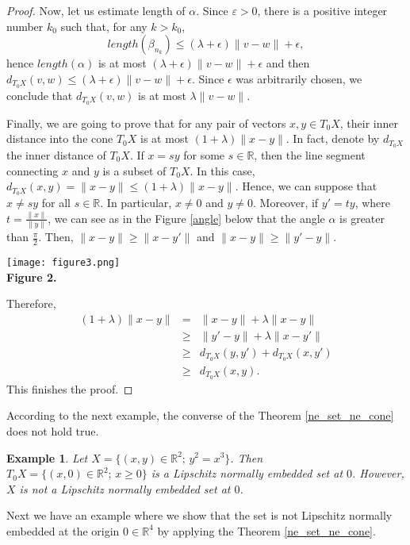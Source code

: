 \documentclass{amsart}
\makeatletter
\newtheorem{example}[theorem]{Example}
\newcommand{\R}{\mathbb{R}}
\newcommand{\mlabel}[2]{\def\@currentlabel{#2}\label{#1}} %
\makeatother
\begin{document}
\begin{proof}
Now, let us estimate length of $\alpha$. Since $\varepsilon >0$, there is a positive integer number $k_0$ such that, for any $k>k_0$, $$ length(\beta_{n_k})\leq (\lambda+\epsilon)\|v-w\|+\epsilon, $$ hence $length(\alpha)$ is at most $(\lambda+\epsilon)\| v-w\|+\epsilon$ and then $d_{T_0X}(v,w)\leq (\lambda+\epsilon)\|v-w\|+\epsilon.$ Since $\epsilon$ was arbitrarily chosen, we conclude that $d_{T_0X}(v,w)$ is at most $\lambda \| v-w\|$.

Finally, we are going to prove that for any pair of vectors $x,y\in T_0X$, their inner distance into the cone $T_0X$ is at most $(1+\lambda)\| x- y\|$. In fact, denote by $d_{T_0X}$ the inner distance of $T_0X$. If $x=sy$ for some $s\in \R$, then the line segment connecting $x$ and $y$ is a subset of ${T_0X}$. In this case, $d_{T_0X}(x,y)=\|x-y\| \leq (1+\lambda)\| x- y\|$. Hence, we can suppose that $x\not=sy$ for all $s\in \R$. In particular, $x\not =0$ and $y\not =0$. Moreover, if $y'=ty$, where $t=\frac{\|x\|}{\|y\|}$, we can see as in the Figure \ref{angle} below that the angle $\alpha$ is greater than $\frac{\pi}{2}$. Then, $\|x-y\|\geq \|x-y'\|$ and $\|x-y\|\geq \|y'-y\|$.
\begin{center}\mlabel{angle}{2}
\texttt{[image: figure3.png]}\\
{\bf Figure 2.}
\end{center}
Therefore,
\begin{eqnarray*}
(1+\lambda)\| x - y\|& = & \| x - y\| +\lambda \| x - y\| \\
&\geq& \| y'- y \| + \lambda \| x - y'\| \\
&\geq& d_{T_0X}(y,y') + d_{T_0X}(x,y') \\
&\geq& d_{T_0X}(x,y).
\end{eqnarray*}
This finishes the proof.
\end{proof}
According to the next example, the converse of the Theorem \ref{ne_set_ne_cone} does not hold true.
\begin{example}
 Let $X=\{(x,y)\in \R^2;\, y^2=x^3\}$. Then $T_0X=\{(x,0)\in\R^2;\, x\geq 0\}$ is a Lipschitz normally embedded set at $0$. However, $X$ is not a Lipschitz normally embedded set at $0$.
\end{example}

Next we have an example where we show that the set is not Lipschitz normally embedded at the origin $0\in\R^4$ by applying the Theorem \ref{ne_set_ne_cone}.
\end{document}
